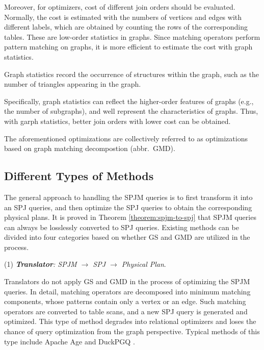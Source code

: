 Moreover, for optimizers, cost of different join orders should be evaluated.
Normally, the cost is estimated with the numbers of vertices and edges with different labels, which are obtained by counting the rows of the corresponding tables.
These are low-order statistics in graphs.
Since matching operators perform pattern matching on graphs, it is more efficient to estimate the cost with graph statistics.

\begin{definition}
    Graph statistics record the occurrence of structures within the graph, such as the number of triangles appearing in the graph.
\end{definition}

Specifically, graph statistics can reflect the higher-order features of graphs (e.g., the number of subgraphs), and well represent the characteristics of graphs.
Thus, with garph statistics, better join orders with lower cost can be obtained.

The aforementioned optimizations are collectively referred to as optimizations based on graph matching decompostion (abbr.~GMD).


\subsection{Different Types of Methods}
\label{sec:different-type-of-methods}

The general approach to handling the SPJM queries is to first transform it into an SPJ queries, and then optimize the SPJ queries to obtain the corresponding physical plans.
It is proved in Theorem \ref{theorem:spjm-to-spj} that SPJM queries can always be losslessly converted to SPJ queries.
Existing methods can be divided into four categories based on whether GS and GMD are utilized in the process.

(1) \emph{\textbf{Translator}: SPJM $\rightarrow$ SPJ $\rightarrow$ Physical Plan}.

Translators do not apply GS and GMD in the process of optimizing the SPJM queries.
In detail, matching operators are decomposed into minimum matching components, whose patterns contain only a vertex or an edge.
Such matching operators are converted to table scans, and a new SPJ query is generated and optimized.
This type of method degrades into relational optimizers and loses the chance of query optimization from the graph perspective.
Typical methods of this type include Apache Age \cite{apache-age} and DuckPGQ \cite{DuckPGQ,DuckPGQ-VLDB}.



